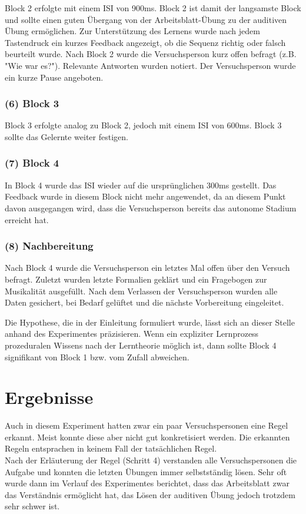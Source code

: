 \documentclass[doc,a4paper,12pt]{apa6}
\begin{document}
Block 2 erfolgte mit einem ISI von 900ms. Block 2 ist damit der langsamste Block und sollte einen guten Übergang von der Arbeitsblatt-Übung zu der auditiven Übung ermöglichen. Zur Unterstützung des Lernens wurde nach jedem Tastendruck ein kurzes Feedback angezeigt, ob die Sequenz richtig oder falsch beurteilt wurde. Nach Block 2 wurde die Versuchsperson kurz offen befragt (z.B. "Wie war es?"). Relevante Antworten wurden notiert. Der Versuchsperson wurde ein kurze Pause angeboten.

\subsubsection{(6) Block 3}

Block 3 erfolgte analog zu Block 2, jedoch mit einem ISI von 600ms. Block 3 sollte das Gelernte weiter festigen.

\subsubsection{(7) Block 4}

In Block 4 wurde das ISI wieder auf die ursprünglichen 300ms gestellt. Das Feedback wurde in diesem Block nicht mehr angewendet, da an diesem Punkt davon ausgegangen wird, dass die Versuchsperson bereits das autonome Stadium erreicht hat.

\subsubsection{(8) Nachbereitung}

Nach Block 4 wurde die Versuchsperson ein letztes Mal offen über den Versuch befragt. Zuletzt wurden letzte Formalien geklärt und ein Fragebogen zur Musikalität ausgefüllt. Nach dem Verlassen der Versuchsperson wurden alle Daten gesichert, bei Bedarf gelüftet und die nächste Vorbereitung eingeleitet.

Die Hypothese, die in der Einleitung formuliert wurde, lässt sich an dieser Stelle anhand des Experimentes präzisieren. Wenn ein expliziter Lernprozess prozeduralen Wissens nach der Lerntheorie möglich ist, dann sollte Block 4 signifikant von Block 1 bzw. vom Zufall abweichen.

\section{Ergebnisse}

Auch in diesem Experiment hatten zwar ein paar Versuchspersonen eine Regel erkannt. Meist konnte diese aber nicht gut konkretisiert werden. Die erkannten Regeln entsprachen in keinem Fall der tatsächlichen Regel.\\
Nach der Erläuterung der Regel (Schritt 4) verstanden alle Versuchspersonen die Aufgabe und konnten die letzten Übungen immer selbstständig lösen. Sehr oft wurde dann im Verlauf des Experimentes berichtet, dass das Arbeitsblatt zwar das Verständnis ermöglicht hat, das Lösen der auditiven Übung jedoch trotzdem sehr schwer ist.
\end{document}
